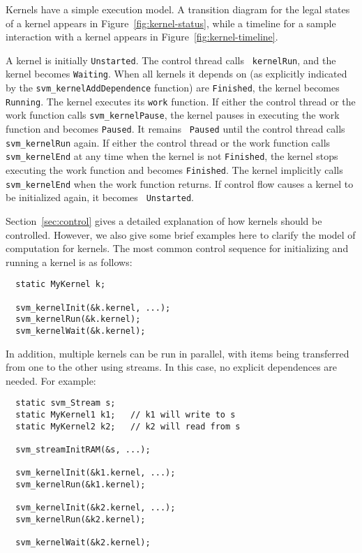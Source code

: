 
Kernels have a simple execution model. A transition diagram for the
legal states of a kernel appears in Figure~\ref{fig:kernel-status},
while a timeline for a sample interaction with a kernel appears in
Figure~\ref{fig:kernel-timeline}.

A kernel is initially {\tt Unstarted}.  The control thread calls {\tt
kernelRun}, and the kernel becomes {\tt Waiting}.  When all kernels it
depends on (as explicitly indicated by the {\tt svm\_kernelAddDependence}
function) are {\tt Finished}, the kernel becomes {\tt Running}. The
kernel executes its {\tt work} function.  If either the control thread
or the work function calls {\tt svm\_kernelPause}, the kernel pauses in
executing the work function and becomes {\tt Paused}. It remains {\tt
Paused} until the control thread calls {\tt svm\_kernelRun} again. If
either the control thread or the work function calls {\tt svm\_kernelEnd}
at any time when the kernel is not {\tt Finished}, the kernel stops
executing the work function and becomes {\tt Finished}. The kernel
implicitly calls {\tt svm\_kernelEnd} when the work function returns. If
control flow causes a kernel to be initialized again, it becomes {\tt
Unstarted}.

Section~\ref{sec:control} gives a detailed explanation of how kernels
should be controlled.  However, we also give some brief examples here
to clarify the model of computation for kernels.  The most common
control sequence for initializing and running a kernel is as follows:

{\small
\begin{verbatim}
  static MyKernel k;

  svm_kernelInit(&k.kernel, ...);
  svm_kernelRun(&k.kernel);
  svm_kernelWait(&k.kernel);
\end{verbatim}}

In addition, multiple kernels can be run in parallel, with items being
transferred from one to the other using streams.  In this case, no
explicit dependences are needed.  For example:

{\small
\begin{verbatim}
  static svm_Stream s;
  static MyKernel1 k1;   // k1 will write to s
  static MyKernel2 k2;   // k2 will read from s

  svm_streamInitRAM(&s, ...);

  svm_kernelInit(&k1.kernel, ...);  
  svm_kernelRun(&k1.kernel);

  svm_kernelInit(&k2.kernel, ...);
  svm_kernelRun(&k2.kernel);

  svm_kernelWait(&k2.kernel);
\end{verbatim}}

